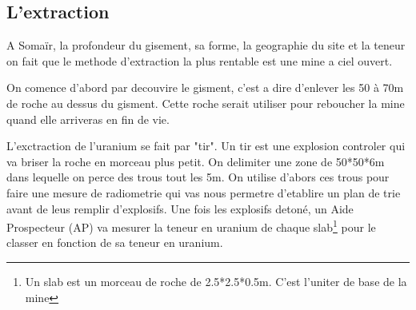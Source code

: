 \subsection{L'extraction}
\label{ssec_extraction}
A Somaïr, la profondeur du gisement, sa forme, la geographie du site et la teneur on fait que le methode d'extraction la plus rentable est une mine a ciel ouvert.

On comence d'abord par decouvire le gisment, c'est a dire d'enlever les 50 à 70m de roche au dessus du gisment. Cette roche serait utiliser pour reboucher la mine quand elle arriveras en fin de vie.

L'exctraction de l'uranium se fait par "tir". Un tir est une explosion controler qui va briser la roche en morceau plus petit. On delimiter une zone de 50*50*6m dans lequelle on perce des trous tout les 5m. On utilise d'abors ces trous pour faire une mesure de radiometrie qui vas nous permetre d'etablire un plan de trie avant de leus remplir d'explosifs. Une fois les explosifs detoné, un Aide Prospecteur (AP) va mesurer la teneur en uranium de chaque slab\footnote{Un slab est un morceau de roche de 2.5*2.5*0.5m. C'est l'uniter de base de la mine} pour le classer en fonction de sa teneur en uranium.



